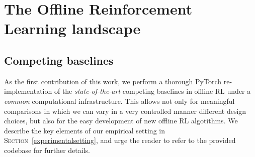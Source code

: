 \section{The Offline Reinforcement Learning landscape}
\label{landscape}

\subsection{Competing baselines}
\label{baselines}

As the first contribution of this work, we perform a thorough PyTorch \cite{Paszke2019-zf}
re-implementation of the
\emph{state-of-the-art} competing baselines in offline RL under a \emph{common} computational infrastructure.
This allows not only for meaningful comparisons in which we can vary in a very controlled manner
different design choices, but also for the easy development of new offline RL algotithms.
We describe the key elements of our empirical setting
in \textsc{Section}~\ref{experimentalsetting},
and urge the reader to refer to the provided codebase for further details.

